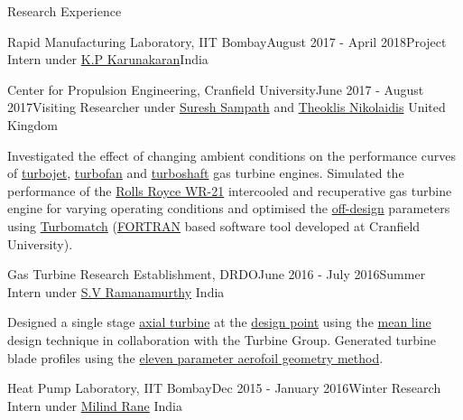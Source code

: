 \documentclass{resume} %
\begin{document}
\begin{rSection}{Research Experience}
\begin{rSubsection}{Rapid Manufacturing Laboratory, IIT Bombay}{August 2017 - April 2018}{Project Intern under \href{https://www.me.iitb.ac.in/?q=faculty/Prof.\%20K.\%20P.\%20Karunakaran}{K.P Karunakaran}}{India}
\end{rSubsection}
\vspace*{-2mm}
\begin{rSubsection}{Center for Propulsion Engineering, Cranfield University}{June 2017 - August 2017}{Visiting Researcher under \href{https://www.linkedin.com/in/dr-suresh-sampath-phd-ceng-fimeche-fie-56084118}{Suresh Sampath} and \href{https://www.cranfield.ac.uk/people/dr-theoklis-nikolaidis-727215}{Theoklis Nikolaidis}} {United Kingdom}
	
\item  Investigated the effect of changing ambient conditions on the performance curves of \href{https://www.grc.nasa.gov/www/k-12/airplane/aturbj.html}{turbojet}, \href{https://www.grc.nasa.gov/www/k-12/airplane/aturbf.html}{turbofan} and \href{https://en.wikipedia.org/wiki/Turboshaft}{turboshaft} gas turbine engines. Simulated the performance of the \href{https://en.wikipedia.org/wiki/Rolls-Royce_WR-21}{Rolls Royce WR-21} intercooled and recuperative gas turbine engine for varying operating conditions and optimised the  \href{http://blog.softinway.com/en/direct-off-design-performance-prediction-of-industrial-gas-turbine-engine/}{off-design}
parameters using \href{https://www.cranfield.ac.uk/centres/centre-for-propulsion-engineering/perseus}{Turbomatch} (\href{https://en.wikipedia.org/wiki/Fortran}{FORTRAN} based software tool developed at Cranfield University).
\end{rSubsection}
\vspace*{-2mm}
\begin{rSubsection}{Gas Turbine Research Establishment, DRDO}{June 2016 - July 2016}{Summer Intern under \href{https://www.researchgate.net/scientific-contributions/2035085680_SV_Ramanamurthy}{S.V Ramanamurthy}} {India}
\item  Designed a single stage \href{https://en.wikipedia.org/wiki/Axial_turbine}{axial turbine} at the \href{https://en.wikiversity.org/wiki/Jet_engine_design_point_performance}{design point} using the \href{http://www.circuitgrove.com/tutorials/axial-flow-compressors-mean-line-analysis}{mean line} design technique in collaboration with the Turbine Group. Generated turbine blade profiles using the \href{http://proceedings.asmedigitalcollection.asme.org/proceeding.aspx?articleid=2213902}{eleven parameter aerofoil geometry method}.
\end{rSubsection}
\vspace*{-2mm}
\begin{rSubsection}{Heat Pump Laboratory, IIT Bombay}{Dec 2015 - January 2016}{Winter Research Intern under  \href{https://www.me.iitb.ac.in/?q=faculty/Prof.\%20Milind\%20V.\%20Rane}{Milind Rane}} {India}

\end{rSubsection}
\end{rSection}
\end{document}
